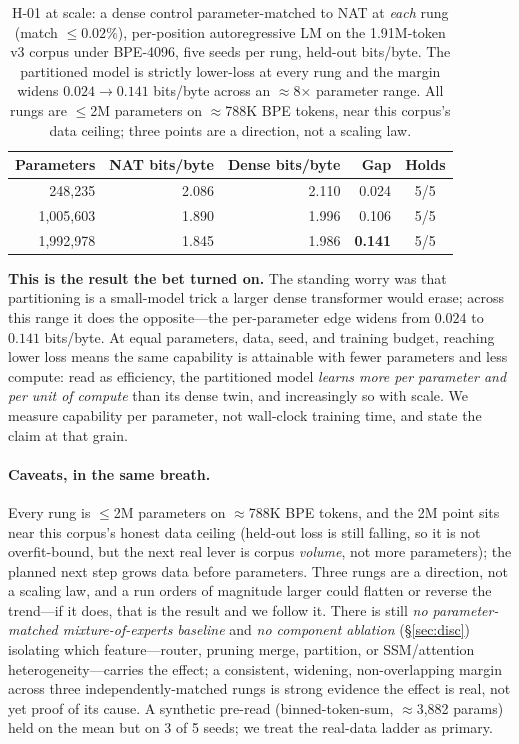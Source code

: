 \documentclass[11pt]{article}
\begin{document}
\begin{table}[h]\centering\small
\begin{tabular}{@{}rrrrc@{}}
\toprule
Parameters & NAT bits/byte & Dense bits/byte & Gap & Holds \\
\midrule
248{,}235 & 2.086 & 2.110 & 0.024 & 5/5 \\
1{,}005{,}603 & 1.890 & 1.996 & 0.106 & 5/5 \\
1{,}992{,}978 & 1.845 & 1.986 & \textbf{0.141} & 5/5 \\
\bottomrule
\end{tabular}
\caption{H-01 at scale: a dense control parameter-matched to NAT at \emph{each} rung (match
$\le0.02\%$), per-position autoregressive LM on the 1.91M-token v3 corpus under BPE-4096, five seeds
per rung, held-out bits/byte. The partitioned model is strictly lower-loss at every rung and the
margin widens $0.024 \to 0.141$ bits/byte across an $\approx$8$\times$ parameter range. All rungs are
$\le$2M parameters on $\approx$788K BPE tokens, near this corpus's data ceiling; three points are a
direction, not a scaling law.}
\label{tab:h01ladder}
\end{table}

\textbf{This is the result the bet turned on.} The standing worry was that partitioning is a
small-model trick a larger dense transformer would erase; across this range it does the opposite---the
per-parameter edge widens from $0.024$ to $0.141$ bits/byte. At equal parameters, data, seed, and
training budget, reaching lower loss means the same capability is attainable with fewer parameters
and less compute: read as efficiency, the partitioned model \emph{learns more per parameter and per
unit of compute} than its dense twin, and increasingly so with scale. We measure capability per
parameter, not wall-clock training time, and state the claim at that grain.

\paragraph{Caveats, in the same breath.}
Every rung is $\le$2M parameters on $\approx$788K BPE tokens, and the 2M point sits near this corpus's
honest data ceiling (held-out loss is still falling, so it is not overfit-bound, but the next real
lever is corpus \emph{volume}, not more parameters); the planned next step grows data before
parameters. Three rungs are a direction, not a scaling law, and a run orders of magnitude larger
could flatten or reverse the trend---if it does, that is the result and we follow it. There is still
\emph{no parameter-matched mixture-of-experts baseline} and \emph{no component ablation}
(\S\ref{sec:disc}) isolating which feature---router, pruning merge, partition, or SSM/attention
heterogeneity---carries the effect; a consistent, widening, non-overlapping margin across three
independently-matched rungs is strong evidence the effect is real, not yet proof of its cause. A
synthetic pre-read (binned-token-sum, $\approx$3{,}882 params) held on the mean but on 3 of 5 seeds;
we treat the real-data ladder as primary.
\end{document}
